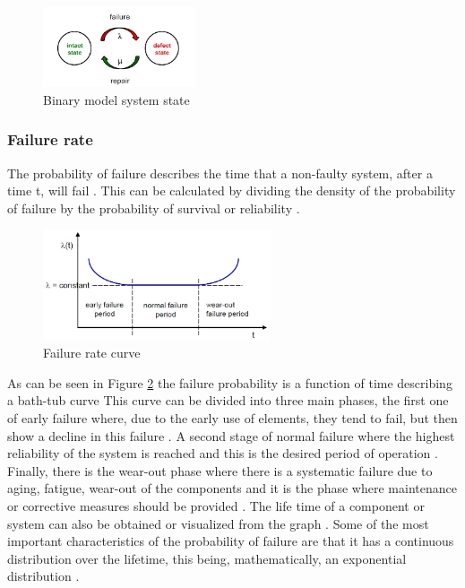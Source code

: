 \documentclass{article}
\begin{document}
\begin{doublespacing}
\begin{figure}[H] 
    \centering
    \includegraphics[width=0.4\textwidth]{Images/BinaryModelSystemState.JPG} 
    \caption{Binary model system state \cite{kaestner:Mark}} 
    \label{fig:BinaryModel} 
\end{figure}



\subsubsection{Failure rate}

\par The probability of failure describes the time that a non-faulty system, after a time t, will fail \cite{kaestner:Mark}. This can be calculated by dividing the density of the probability of failure by the probability of survival or reliability \cite{kaestner:Mark}.

\begin{figure}[H] 
    \centering
    \includegraphics[width=0.6\textwidth]{Images/BathCurve.JPG} 
    \caption{Failure rate curve \cite{kaestner:Mark}} 
    \label{fig:BathCurve} 
\end{figure}

\par As can be seen in Figure \ref{fig:BathCurve} the failure probability is a function of time describing a bath-tub curve \cite{kaestner:Mark} This curve can be divided into three main phases, the first one of early failure where, due to the early use of elements, they tend to fail, but then show a decline in this failure \cite{kaestner:Mark}. A second stage of normal failure where the highest reliability of the system is reached and this is the desired period of operation \cite{kaestner:Mark}. Finally, there is the wear-out phase where there is a systematic failure due to aging, fatigue, wear-out of the components and it is the phase where maintenance or corrective measures should be provided \cite{kaestner:Mark}. The life time of a component or system can also be obtained or visualized from the graph . Some of the most important characteristics of the probability of failure are that it has a continuous distribution over the lifetime, this being, mathematically, an exponential distribution \cite{kaestner:Mark}.


\end{doublespacing}
\end{document}
